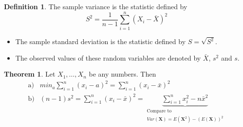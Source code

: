 \documentclass[10pt, twoside, a4paper]{book}
\theoremstyle{definition}
\newtheorem{definition}{Definition}[chapter]
\newtheorem{theorem}{Theorem}[chapter]
\begin{document}
\begin{definition}
The sample variance is the statistic defined by
$$S^2 = \frac{1}{n-1}\sum_{i=1}^n (X_i-\bar X)^2$$
\end{definition}
\begin{itemize}
  \item The sample standard deviation is the statistic defined by $S =
  \sqrt{S^2}$.
  \item The observed values of these random variables are denoted by $\bar X$,
  $s^2$ and $s$.
\end{itemize}
\begin{theorem}
\label{theoremXbarSigma}
Let $X_1,\ldots,X_n$ be any numbers. Then
\begin{equation*}
\renewcommand{\arraystretch}{1.6}
\begin{array}{lll}
\text{a)} & min_a \sum_{i=1}^n (x_i-a)^2 = \sum_{i=1}^n(x_i-\bar x)^2 \\
\text{b)} & (n-1)s^2 = \sum_{i=1}^n (x_i-\bar x)^2 = \underbrace{\sum_{i=1}^n
x_i^2-n\bar x^2}_{\substack{\text{Compare to} \\ Var(\bm X) = E(\bm
X^2)-(E(\bm X))^2}} %
\\
\end{array}
\end{equation*}
\end{theorem}
\end{document}
